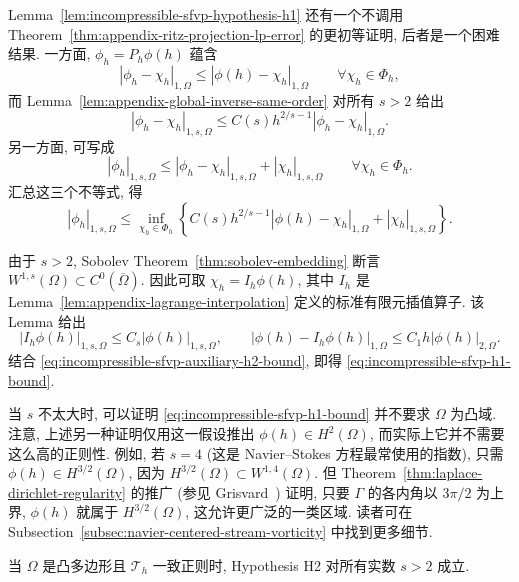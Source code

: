 \begin{Remark}\label{rem:incompressible-sfvp-elementary-h1-proof}
Lemma~\ref{lem:incompressible-sfvp-hypothesis-h1}
还有一个不调用 Theorem~\ref{thm:appendix-ritz-projection-lp-error}
的更初等证明, 后者是一个困难结果.
一方面, $\phi_h=P_h\phi(h)$ 蕴含
\[
|\phi_h-\chi_h|_{1,\Omega}
\leq|\phi(h)-\chi_h|_{1,\Omega}
\qquad\forall\chi_h\in\Phi_h,
\]
而 Lemma~\ref{lem:appendix-global-inverse-same-order} 对所有 $s>2$ 给出
\[
|\phi_h-\chi_h|_{1,s,\Omega}
\leq C(s)h^{2/s-1}|\phi_h-\chi_h|_{1,\Omega}.
\]
另一方面, 可写成
\[
|\phi_h|_{1,s,\Omega}
\leq|\phi_h-\chi_h|_{1,s,\Omega}
+|\chi_h|_{1,s,\Omega}
\qquad\forall\chi_h\in\Phi_h.
\]
汇总这三个不等式, 得
\[
|\phi_h|_{1,s,\Omega}
\leq\inf_{\chi_h\in\Phi_h}
\left\{C(s)h^{2/s-1}|\phi(h)-\chi_h|_{1,\Omega}
+|\chi_h|_{1,s,\Omega}\right\}.
\]

由于 $s>2$, Sobolev Theorem~\ref{thm:sobolev-embedding}
断言 $W^{1,s}(\Omega)\subset C^0(\overline\Omega)$.
因此可取 $\chi_h=I_h\phi(h)$,
其中 $I_h$ 是 Lemma~\ref{lem:appendix-lagrange-interpolation}
定义的标准有限元插值算子. 该 Lemma 给出
\[
|I_h\phi(h)|_{1,s,\Omega}
\leq C_s|\phi(h)|_{1,s,\Omega},
\qquad
|\phi(h)-I_h\phi(h)|_{1,\Omega}
\leq C_1h|\phi(h)|_{2,\Omega}.
\]
结合 \eqref{eq:incompressible-sfvp-auxiliary-h2-bound},
即得 \eqref{eq:incompressible-sfvp-h1-bound}.
\end{Remark}

\begin{Remark}\label{rem:incompressible-sfvp-nonconvex-h1}
当 $s$ 不太大时, 可以证明
\eqref{eq:incompressible-sfvp-h1-bound}
并不要求 $\Omega$ 为凸域.
注意, 上述另一种证明仅用这一假设推出 $\phi(h)\in H^2(\Omega)$,
而实际上它并不需要这么高的正则性.
例如, 若 $s=4$ (这是 Navier--Stokes 方程最常使用的指数),
只需 $\phi(h)\in H^{3/2}(\Omega)$,
因为 $H^{3/2}(\Omega)\subset W^{1,4}(\Omega)$.
但 Theorem~\ref{thm:laplace-dirichlet-regularity}
的推广 (参见 Grisvard~\cite{ref:grisvard-42}) 证明,
只要 $\Gamma$ 的各内角以 $3\pi/2$ 为上界,
$\phi(h)$ 就属于 $H^{3/2}(\Omega)$,
这允许更广泛的一类区域.
读者可在 Subsection~\ref{subsec:navier-centered-stream-vorticity} 中找到更多细节.
\end{Remark}

\begin{Lemma}\label{lem:incompressible-sfvp-hypothesis-h2}
当 $\Omega$ 是凸多边形且 $\mathcal T_h$ 一致正则时,
Hypothesis H2 对所有实数 $s>2$ 成立.
\end{Lemma}

